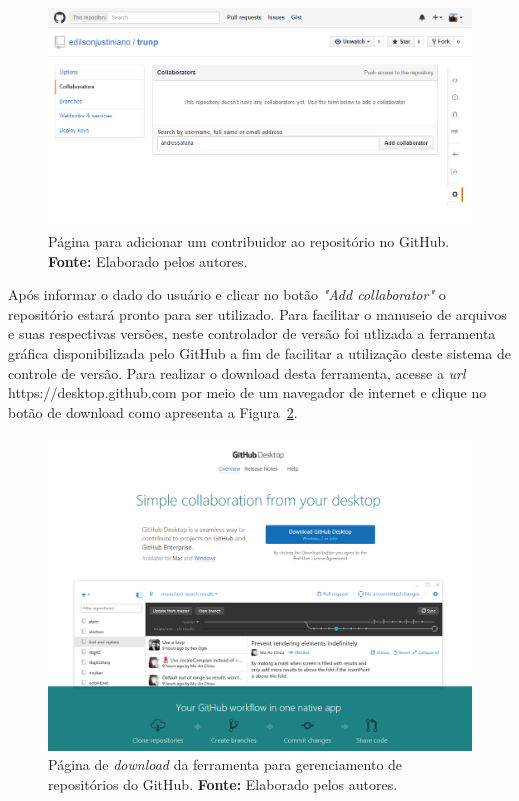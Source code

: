 \captionsetup[figure]{list=no}
\begin{figure}[h!]
	\centerline{\includegraphics[scale=0.5]{./imagens/apendices/pagina-adicionar-colaborador-ao-repositorio.png}}
	\caption[Página para adicionar um contribuidor ao repositório no GitHub.]
	{Página para adicionar um contribuidor ao repositório no GitHub. \textbf{Fonte:} Elaborado pelos autores.}
	\label{fig:ap1:pagina_adicionar_colaborador_repositorio_github}
\end{figure}

Após informar o dado do usuário e clicar no botão \textit{"Add collaborator"} o repositório estará pronto para ser utilizado. Para facilitar o manuseio de arquivos e suas respectivas versões, neste controlador de versão foi utlizada a ferramenta gráfica disponibilizada pelo GitHub a fim de facilitar a utilização deste sistema de controle de versão. Para realizar o download desta ferramenta, acesse a \textit{url} https://desktop.github.com por meio de um navegador de internet e clique no botão de download como apresenta a Figura~\ref{fig:ap1:pagina_download_github_para_windows}.

\captionsetup[figure]{list=no}
\begin{figure}[h!]
	\centerline{\includegraphics[scale=0.4]{./imagens/apendices/pagina-download-github.png}}
	\caption[Página de \textit{download} da ferramenta para gerenciamento de repositórios do GitHub.]
	{Página de \textit{download} da ferramenta para gerenciamento de repositórios do GitHub. \textbf{Fonte:} Elaborado pelos autores.}
	\label{fig:ap1:pagina_download_github_para_windows}
\end{figure}

